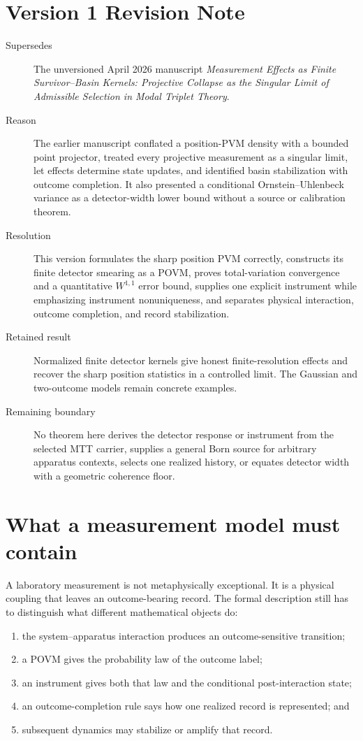 \documentclass[11pt]{article}
\begin{document}
\section*{Version 1 Revision Note}
\begin{description}
\item[Supersedes] The unversioned April 2026 manuscript
\emph{Measurement Effects as Finite Survivor--Basin Kernels: Projective
Collapse as the Singular Limit of Admissible Selection in Modal Triplet
Theory}.
\item[Reason] The earlier manuscript conflated a position-PVM density with a
bounded point projector, treated every projective measurement as a singular
limit, let effects determine state updates, and identified basin
stabilization with outcome completion. It also presented a conditional
Ornstein--Uhlenbeck variance as a detector-width lower bound without a source
or calibration theorem.
\item[Resolution] This version formulates the sharp position PVM correctly,
constructs its finite detector smearing as a POVM, proves total-variation
convergence and a quantitative \(W^{1,1}\) error bound, supplies one explicit
instrument while emphasizing instrument nonuniqueness, and separates physical
interaction, outcome completion, and record stabilization.
\item[Retained result] Normalized finite detector kernels give honest
finite-resolution effects and recover the sharp position statistics in a
controlled limit. The Gaussian and two-outcome models remain concrete
examples.
\item[Remaining boundary] No theorem here derives the detector response or
instrument from the selected MTT carrier, supplies a general Born source for
arbitrary apparatus contexts, selects one realized history, or equates
detector width with a geometric coherence floor.
\end{description}

\tableofcontents

\section{What a measurement model must contain}

A laboratory measurement is not metaphysically exceptional. It is a physical
coupling that leaves an outcome-bearing record. The formal description still
has to distinguish what different mathematical objects do:
\begin{enumerate}
\item the system--apparatus interaction produces an outcome-sensitive
transition;
\item a POVM gives the probability law of the outcome label;
\item an instrument gives both that law and the conditional post-interaction
state;
\item an outcome-completion rule says how one realized record is represented;
and
\item subsequent dynamics may stabilize or amplify that record.
\end{enumerate}
\end{document}
